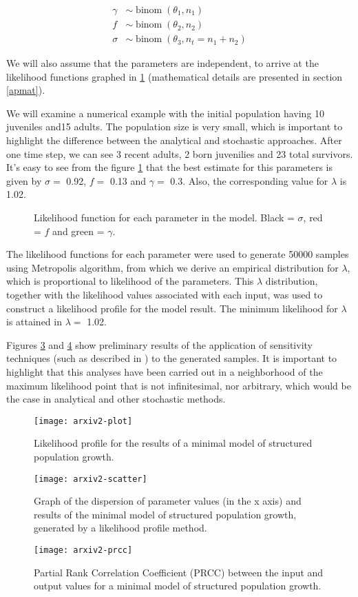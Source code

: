 \documentclass[twoside,12pt,a4paper]{article}
\begin{document}
\begin{align}
	\gamma & \sim \operatorname{binom}(\theta_1, n_1) \\
	f      & \sim \operatorname{binom}(\theta_2, n_2) \\
	\sigma & \sim \operatorname{binom}(\theta_3, n_t = n_1+n_2)
\end{align}

We will also assume that the parameters are independent, to arrive at the likelihood functions graphed in
\ref{fig:LikFunc} (mathematical details are presented in section \ref{apmat}).


We will examine a numerical example with the initial population having 10 juveniles and15
adults. The population size is very small, which is important to highlight the difference between the
analytical and stochastic approaches. After one time step, we can see 
3 recent adults, 2 born juvenilies and 23 total survivors. It's 
easy to see from the figure \ref{fig:LikFunc} that the best estimate for this parameters is given by
$\sigma = $ 0.92, $f = $ 0.13 and $\gamma = $ 0.3.
Also, the corresponding value for $\lambda$ is 1.02.

\begin{figure}
	\caption{Likelihood function for each parameter in the model. Black = $\sigma$, red = $f$ and green = $\gamma$.}
	\label{fig:LikFunc}
\end{figure}

The likelihood functions for each parameter were used to generate
50000 samples using Metropolis algorithm, from which we derive an empirical distribution for
$\lambda$, which is proportional to likelihood of the parameters.
This $\lambda$ distribution, together with the likelihood values associated with each input, was used to
construct a likelihood profile for the model result. The minimum likelihood for 
$\lambda$ is attained in $\lambda = $ 1.02.

Figures \ref{fig:lambdascatter} and \ref{fig:lambdaprcc} show preliminary results of the application of
sensitivity techniques (such as described in \citep{Chalom12}) to the generated samples. It is important
to highlight that this analyses have been carried out in a neighborhood of the maximum likelihood point
that is not infinitesimal, nor arbitrary, which would be the case in analytical and other stochastic methods.

\begin{figure}
\texttt{[image: arxiv2-plot]}
	\caption{Likelihood profile for the results of a minimal model of structured population growth.}
	\label{fig:lambda}
\end{figure}
\begin{figure}
\texttt{[image: arxiv2-scatter]}
	\caption{Graph of the dispersion of parameter values (in the x axis) and results of the 
  minimal model of structured population growth, generated by a likelihood profile method.  }
	\label{fig:lambdascatter}
\end{figure}
\begin{figure}
\texttt{[image: arxiv2-prcc]}
	\caption{Partial Rank Correlation Coefficient (PRCC) between the input and output values for a 
  minimal model of structured population growth.}
	\label{fig:lambdaprcc}
\end{figure}
\end{document}
